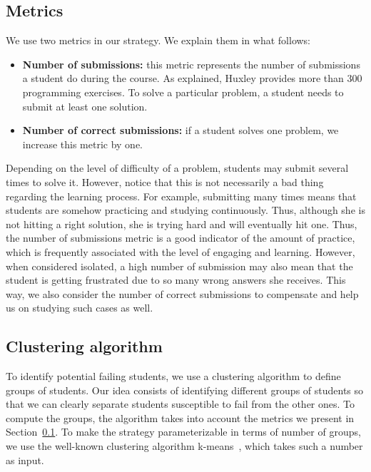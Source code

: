\subsection{Metrics}

\label{sec:metrics}

We use two metrics in our strategy. We explain them in what follows:

\begin{itemize}

	\item \textbf{Number of submissions:} this metric represents the number of submissions a student do during the course. As explained, Huxley provides more than 300 programming exercises. To solve a particular problem, a student needs to submit at least one solution.

	\item \textbf{Number of correct submissions:} if a student solves one problem, we increase this metric by one.

\end{itemize}

Depending on the level of difficulty of a problem, students may submit several times to solve it. However, notice that this is not necessarily a bad thing regarding the learning process. For example, submitting many times means that students are somehow practicing and studying continuously. Thus, although she is not hitting a right solution, she is trying hard and will eventually hit one. Thus, the number of submissions metric is a good indicator of the amount of practice, which is frequently associated with the level of engaging and learning. However, when considered isolated, a high number of submission may also mean that the student is getting frustrated due to so many wrong answers she receives. This way, we also consider the number of correct submissions to compensate and help us on studying such cases as well.


\subsection{Clustering algorithm}

To identify potential failing students, we use a clustering algorithm to define groups of students. Our idea consists of identifying different groups of students so that we can clearly separate students susceptible to fail from the other ones. To compute the groups, the algorithm takes into account the metrics we present in Section~\ref{sec:metrics}. To make the strategy parameterizable in terms of number of groups, we use the well-known clustering algorithm k-means~\cite{}, which takes such a number as input.

